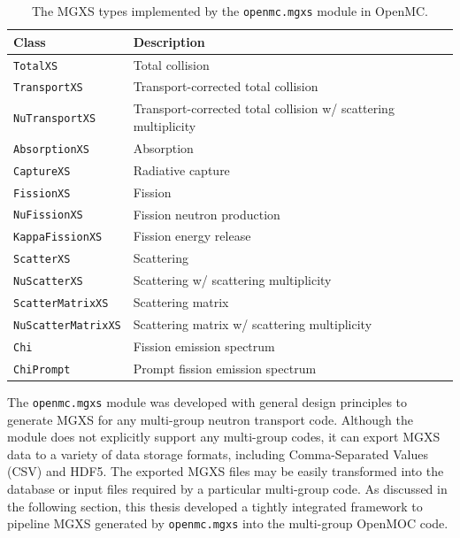 \begin{table}[h!]
  \centering
  \caption[The MGXS types implemented for OpenMC]{The \ac{MGXS} types implemented by the \texttt{openmc.mgxs} module in OpenMC.}
  \small
  \label{table:chap4-mgxs-types} 
  \vspace{6pt}
  \begin{tabular}{l p{10cm}}
  \toprule
  \rowcolor{lightgray}
  {\bf Class} &
  {\bf Description} \\
  \midrule
  \texttt{TotalXS} & Total collision \\
  \texttt{TransportXS} & Transport-corrected total collision \\
  \texttt{NuTransportXS} & Transport-corrected total collision w/ scattering multiplicity \\
  \texttt{AbsorptionXS} & Absorption \\
  \texttt{CaptureXS} & Radiative capture \\
  \texttt{FissionXS} & Fission \\
  \texttt{NuFissionXS} & Fission neutron production \\
  \texttt{KappaFissionXS} & Fission energy release \\
  \texttt{ScatterXS} & Scattering \\
  \texttt{NuScatterXS} & Scattering w/ scattering multiplicity \\
  \texttt{ScatterMatrixXS} & Scattering matrix \\
  \texttt{NuScatterMatrixXS} & Scattering matrix w/ scattering multiplicity \\
  \texttt{Chi} & Fission emission spectrum \\
  \texttt{ChiPrompt} & Prompt fission emission spectrum \\
  \bottomrule
\end{tabular}
\end{table}

The \texttt{openmc.mgxs} module was developed with general design principles to generate \ac{MGXS} for any multi-group neutron transport code. Although the module does not explicitly support any multi-group codes, it can export \ac{MGXS} data to a variety of data storage formats, including Comma-Separated Values (CSV) and \ac{HDF5}. The exported \ac{MGXS} files may be easily transformed into the database or input files required by a particular multi-group code. As discussed in the following section, this thesis developed a tightly integrated framework to pipeline \ac{MGXS} generated by \texttt{openmc.mgxs} into the multi-group OpenMOC code.

